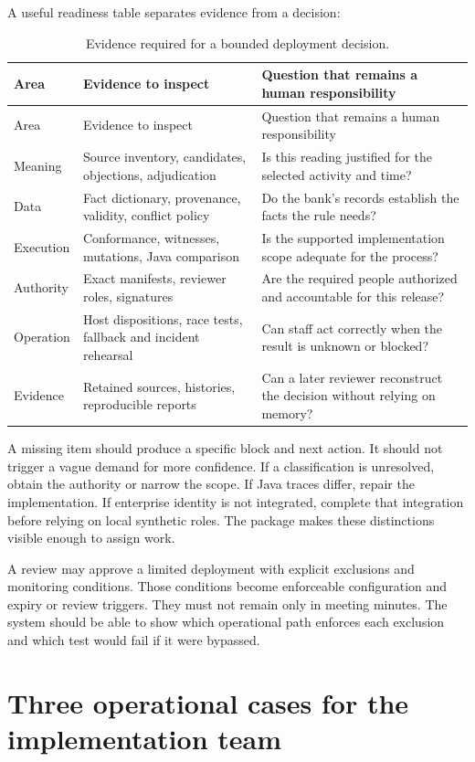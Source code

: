 \documentclass[12pt,a4paper,oneside,openany]{book}
\begin{document}
A useful readiness table separates evidence from a decision:
\begin{longtable}{@{}P{31mm}P{60mm}P{57mm}@{}}
\caption{Evidence required for a bounded deployment decision.}\\
\toprule
Area & Evidence to inspect & Question that remains a human responsibility\\\midrule\endfirsthead
\toprule Area & Evidence to inspect & Question that remains a human responsibility\\\midrule\endhead
Meaning & Source inventory, candidates, objections, adjudication & Is this reading justified for the selected activity and time?\\
Data & Fact dictionary, provenance, validity, conflict policy & Do the bank's records establish the facts the rule needs?\\
Execution & Conformance, witnesses, mutations, Java comparison & Is the supported implementation scope adequate for the process?\\
Authority & Exact manifests, reviewer roles, signatures & Are the required people authorized and accountable for this release?\\
Operation & Host dispositions, race tests, fallback and incident rehearsal & Can staff act correctly when the result is unknown or blocked?\\
Evidence & Retained sources, histories, reproducible reports & Can a later reviewer reconstruct the decision without relying on memory?\\
\bottomrule
\end{longtable}

A missing item should produce a specific block and next action. It should not
trigger a vague demand for more confidence. If a classification is unresolved,
obtain the authority or narrow the scope. If Java traces differ, repair the
implementation. If enterprise identity is not integrated, complete that integration
before relying on local synthetic roles. The package makes these distinctions
visible enough to assign work.

A review may approve a limited deployment with explicit exclusions and monitoring
conditions. Those conditions become enforceable configuration and expiry or
review triggers. They must not remain only in meeting minutes. The system should
be able to show which operational path enforces each exclusion and which test
would fail if it were bypassed.

\section{Three operational cases for the implementation team}
\label{merge:M10:12}
\end{document}
